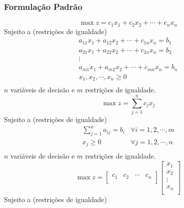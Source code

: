 \begin{frame}
	\frametitle{Formulação Padrão} 
	\begin{mdframed}[backgroundcolor=blue!20] 
		{
			\begin{equation*}
				\max z = c_1x_1 + c_2x_2 + \cdots + c_nx_n 
			\end{equation*}
			{\color{red}Sujeito a (restrições de igualdade)} 
			\begin{equation*}
				\begin{matrix}
					a_{11}x_1 + a_{12}x_2 + \cdots + c_{1n}x_n = b_1 \\
					a_{21}x_1 + a_{22}x_2 + \cdots + c_{2n}x_n = b_2 \\
					\vdots \\
					a_{m1}x_1 + a_{m2}x_2 + \cdots + c_{mn}x_n = b_n \\
					x_1, x_2, \cdots, x_n \ge 0 \\
				\end{matrix}
			\end{equation*}
			$n$ variáveis de decisão e $m$ restrições de igualdade.
		}
		\only<2>
		{
			\begin{equation*}
				\max z = \sum_{j=1}^{n}c_jx_j
			\end{equation*}
			{\color{red}Sujeito a (restrições de igualdade)} 
			\begin{equation*}
				\begin{matrix}
					\sum_{j=1}^{n}a_{ij} = b_i & \forall i = 1, 2, \cdots, m \\
					x_j \ge 0 & \forall j = 1, 2, \cdots, n \\
				\end{matrix}
			\end{equation*}
			$n$ variáveis de decisão e $m$ restrições de igualdade.
		}
		\only<3>
		{
			\begin{equation*} 
				\max z = \begin{bmatrix}
							c_1 & c_2 & \cdots & c_n \\
						 \end{bmatrix}
						 \begin{bmatrix}
							 x_1 \\
							 x_2 \\
							 \vdots \\
							 x_n \\
						 \end{bmatrix}
			\end{equation*}
			{\color{red}Sujeito a (restrições de igualdade)} 
			\begin{equation*}

\end{equation*}}
\end{mdframed}
\end{frame}
